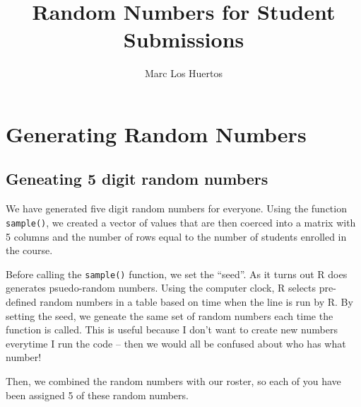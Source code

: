 \documentclass{article}\usepackage[]{graphicx}\usepackage[]{xcolor}
\title{Random Numbers for Student Submissions}
\author{Marc Los Huertos}
\begin{document}
\maketitle



\section*{Generating Random Numbers}

\subsection*{Geneating 5 digit random numbers}

We have generated five digit random numbers for everyone. Using the function \texttt{sample()}, we created a vector of values that are then coerced into a matrix with 5 columns and the number of rows equal to the number of students enrolled in the course. 

Before calling the \texttt{sample()} function, we set the ``seed''. As it turns out R does generates psuedo-random numbers. Using the computer clock, R selects pre-defined random numbers in a table based on time when the line is run by R. By setting the seed, we geneate the same set of random numbers each time the function is called. This is useful because I don't want to create new numbers everytime I run the code -- then we would all be confused about who has what number!



Then, we combined the random numbers with our roster, so each of you have been assigned 5 of these random numbers. 
\end{document}

